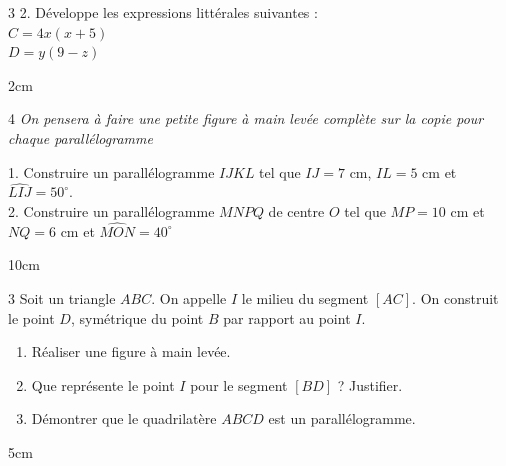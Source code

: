 \documentclass[a4paper]{book}
\begin{document}
{\begin{exerciceNote}{3}
        2. Développe les expressions littérales suivantes :\\
        $C = 4x(x + 5)$\\
        $D = y(9 - z)$
        \begin{ZoneReponse}{2cm}
        \end{ZoneReponse}
    \end{exerciceNote}

\newpage
    
    \begin{exerciceNote}{4}
        \textit{On pensera à faire une petite figure à main levée complète sur la copie pour chaque parallélogramme}
        
        1. Construire un parallélogramme $IJKL$ tel que $IJ = 7$ cm, $IL = 5$ cm et $\widehat{LIJ} = 50^\circ$.\\
        2. Construire un parallélogramme $MNPQ$ de centre $O$ tel que $MP = 10$ cm et $NQ = 6$ cm et $\widehat{MON}=40^{\circ}$
        
        \begin{ZoneReponse}{10cm}
        \end{ZoneReponse}
    \end{exerciceNote}

    \begin{exerciceNote}{3}
        Soit un triangle $ABC$. On appelle $I$ le milieu du segment $[AC]$.
        On construit le point $D$, symétrique du point $B$ par rapport au point $I$.
        
        \begin{enumerate}
            \item Réaliser une figure à main levée.
            \item Que représente le point $I$ pour le segment $[BD]$ ? Justifier.
            \item Démontrer que le quadrilatère $ABCD$ est un parallélogramme.
        \end{enumerate}

        \begin{ZoneReponse}{5cm}
        \end{ZoneReponse}
    \end{exerciceNote}

}
\end{document}
